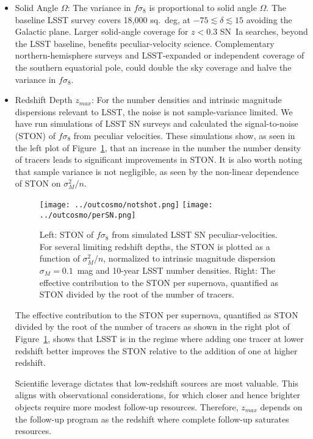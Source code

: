 \documentclass{aastex62}   	%
\begin{document}
\begin{itemize}
\item Solid Angle $\Omega$:
The variance in $f\sigma_8$ is proportional to solid angle $\Omega$.  The baseline
LSST survey covers 18,000 sq.~deg, at $-75 \lesssim \delta \lesssim15$ avoiding the Galactic plane.  Larger solid-angle coverage for $z<0.3$ SN~Ia searches, beyond
the LSST baseline, benefits peculiar-velocity science.  Complementary northern-hemisphere surveys and LSST-expanded or independent
coverage of the southern equatorial pole, could double
the sky coverage and halve the variance in $f\sigma_8$.
\item Redshift Depth $z_{max}$:
For the number densities and intrinsic magnitude dispersions relevant to LSST, the noise is not sample-variance
limited.  We have run simulations of LSST SN surveys
and calculated the signal-to-noise (STON) of $f\sigma_8$ from peculiar velocities. These simulations show, as seen in the left plot
of  Figure~\ref{notshot:fig}, that an increase in the number the number density of tracers leads to significant improvements in STON.
It is also worth noting that sample variance is not negligible, as seen by the non-linear dependence of  STON on $\sigma_M^2/n$. 

\begin{figure}
\centering
\texttt{[image: ../outcosmo/notshot.png]}
\texttt{[image: ../outcosmo/perSN.png]}
\caption{Left: STON of $f\sigma_8$ from simulated LSST SN peculiar-velocities.  For several limiting redshift depths, the STON is plotted as a
function of $\sigma_M^2/n$, normalized to intrinsic magnitude dispersion $\sigma_M=0.1$~mag and 10-year LSST number densities.
Right: The effective contribution to the STON per supernova, quantified as STON divided by the root of the number of tracers.
\label{notshot:fig}}
\end{figure}

The effective contribution to the STON per supernova, quantified as STON divided by the root of the number of tracers as shown in the
right plot of   Figure~\ref{notshot:fig}, shows that LSST is in the regime where adding one tracer at lower redshift better improves the 
STON relative to the addition of one at higher redshift.

Scientific leverage dictates that low-redshift sources are most valuable.
This aligns with observational considerations, for which closer and hence brighter objects require more modest follow-up resources.
Therefore, $z_{max}$ depends on the follow-up program as the redshift where complete follow-up saturates resources.


\end{itemize}
\end{document}
